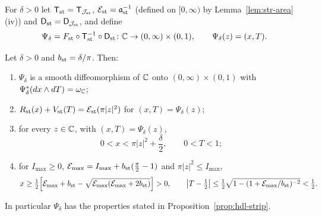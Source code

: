 \begin{construction}\label{cons:str-map}
For $\delta>0$ let $\mathsf T_{\rm st}=\mathsf T_{\mathcal J_{\rm st}}$, $\mathcal E_{\rm st}=\mathfrak a_{\rm st}^{-1}$ (defined on
$[0,\infty)$ by Lemma~\ref{lem:str-area}(iv)) and $\mathsf D_{\rm st}=\mathsf D_{\mathcal J_{\rm st}}$, and define
\[
 \Psi_\delta=F_{\rm st}\circ\mathsf T_{\rm st}^{-1}\circ\mathsf D_{\rm st}\colon\mathbb{C}\to(0,\infty)\times(0,1),\qquad
 \Psi_\delta(z)=(x,T).
\]
\end{construction}

\begin{proposition}\label{prop:str-strip}
Let $\delta>0$ and $b_{\rm st}=\delta/\pi$. Then:
\begin{enumerate}[label=(\roman*)]
\item $\Psi_\delta$ is a smooth diffeomorphism of $\mathbb{C}$ onto $(0,\infty)\times(0,1)$ with
$\Psi_\delta^*(dx\wedge dT)=\omega_{\mathbb{C}}$;
\item $R_{\rm st}(x)+V_{\rm st}(T)=\mathcal E_{\rm st}(\pi|z|^2)$ for $(x,T)=\Psi_\delta(z)$;
\item for every $z\in\mathbb{C}$, with $(x,T)=\Psi_\delta(z)$,
\begin{equation}\label{eq:str-x-bound}
 0<x<\pi|z|^2+\frac\delta2,\qquad 0<T<1;
\end{equation}
\item for $I_{\max}\ge0$, $\mathcal E_{\max}=I_{\max}+b_{\rm st}(\frac\pi2-1)$ and $\pi|z|^2\le I_{\max}$,
\[
 x\ge\tfrac12\Big[\mathcal E_{\max}+b_{\rm st}-\sqrt{\mathcal E_{\max}(\mathcal E_{\max}+2b_{\rm st})}\Big]>0,\qquad
 \big|T-\tfrac12\big|\le\tfrac12\sqrt{1-(1+\mathcal E_{\max}/b_{\rm st})^{-2}}<\tfrac12 .
\]
\end{enumerate}
In particular $\Psi_\delta$ has the properties stated in Proposition~\ref{prop:hdl-strip}.
\end{proposition}

